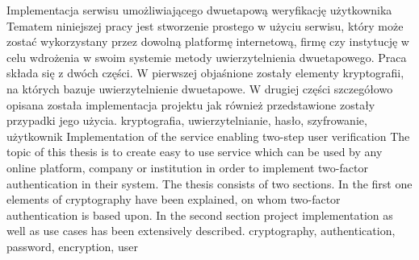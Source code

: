 \abstractpage
{Implementacja serwisu umożliwiającego dwuetapową weryfikację użytkownika}
{Tematem niniejszej pracy jest stworzenie prostego w użyciu serwisu, który może zostać wykorzystany przez dowolną 
platformę internetową, firmę czy instytucję w celu wdrożenia w swoim systemie metody 
uwierzytelnienia dwuetapowego.
Praca składa się z dwóch części. 
W pierwszej objaśnione zostały elementy kryptografii, 
na których bazuje uwierzytelnienie dwuetapowe. 
W drugiej części szczegółowo opisana została implementacja projektu 
jak również przedstawione zostały przypadki jego użycia. }
{kryptografia, uwierzytelnianie, hasło, szyfrowanie, użytkownik}
{Implementation of the service enabling two-step user verification}
{The topic of this thesis is to create easy to use service which can be used by any 
online platform, company or institution in order to implement two-factor authentication 
in their system.
The thesis consists of two sections. 
In the first one elements of cryptography have been explained, on whom two-factor authentication is based upon. 
In the second section project implementation as well as use cases has been extensively described.}
{cryptography, authentication, password, encryption, user}